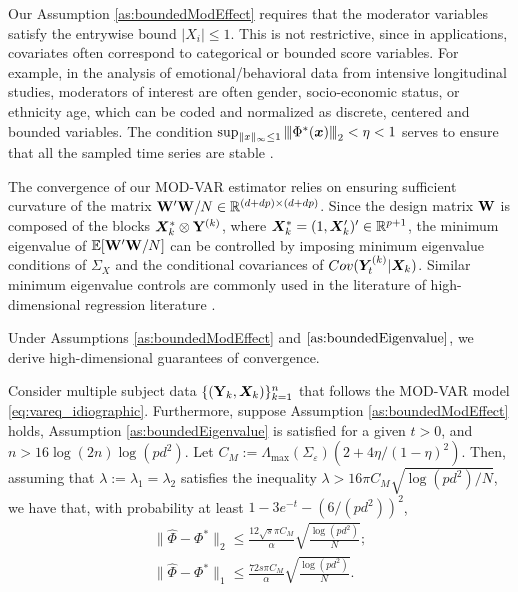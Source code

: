 Our Assumption \ref{as:boundedModEffect} requires that the moderator variables satisfy the entrywise bound $|X_i|\leq 1$. This is not restrictive, since in applications, covariates often correspond to categorical or bounded score variables. For example, in the analysis of emotional/behavioral data from intensive longitudinal studies, moderators of interest are often gender, socio-economic status, or ethnicity age, which can be coded and normalized as discrete, centered and bounded variables. The condition $\sup_{\|x\|_\infty \leq 1} {\left\vert\kern-0.25ex\left\vert\kern-0.25ex\left\vert \Phi^*(\bm{x}) \right\vert\kern-0.25ex\right\vert\kern-0.25ex\right\vert}_2 < \eta < 1 $ serves to ensure that all the sampled time series are stable \citep{basu2015regularized}.

The convergence of our MOD-VAR estimator relies on ensuring sufficient curvature of the matrix $\mathbf{W}'\mathbf{W}/N\in\mathbb{R}^{(d+dp)\times (d+dp)}$. Since the design matrix $\mathbf{W}$ is composed of the blocks  $\bm{X}_k^*\otimes \mathbf{Y}^{(k)}$, where $\bm{X}_k^* = (1,\bm{X}_k')'\in\mathbb{R}^{p+1}$, the minimum eigenvalue of $\mathbb{E}[\mathbf{W}'\mathbf{W}/N]$ can be controlled by imposing minimum eigenvalue conditions of $\Sigma_X$ and the conditional covariances of $Cov(\bm{Y}_t^{(k)}| \bm{X}_k)$. Similar minimum eigenvalue controls are commonly used in the literature of high-dimensional regression literature \citep{loh2011high,basu2015regularized,wainwright2019high}. 

Under Assumptions \ref{as:boundedModEffect} and $\ref{as:boundedEigenvalue}$, we derive high-dimensional guarantees of convergence.

\begin{thm}\label{thm:modvar_normconsistency}
    Consider multiple subject data $\{(\mathbf{Y}_k, \bm{X}_k)\}_{k=1}^n$ that follows the MOD-VAR model \eqref{eq:vareq_idiographic}. Furthermore, suppose Assumption \ref{as:boundedModEffect} holds, Assumption \ref{as:boundedEigenvalue} is satisfied for a given $t> 0$, and $n > 16\log(2n)\log(pd^2)$. Let $C_M := \Lambda_{\max}(\Sigma_\varepsilon)(2 + 4\eta / (1 - \eta)^2 ).$
    Then, assuming that $\lambda:= \lambda_1 = \lambda_2$ satisfies the inequality $\lambda > 16 \pi C_M  \sqrt{{\log(pd^2)}/{N}}$, we have that, with probability at least $1 - 3e^{-t} - (6/(pd^2))^2$,
    \begin{align}
        \|\hat\Phi - \Phi^* \|_2  \leq \frac{12\sqrt{s} \pi C_M}{\alpha}  \sqrt{\frac{\log(pd^2)}{N}};  \label{eq:consistency_l2}\\
        \| \hat\Phi - \Phi^*\|_1 \leq  \frac{72 s \pi C_M}{\alpha}  \sqrt{\frac{\log(pd^2)}{N}}.\label{eq:consistency_l1}
    \end{align}
\end{thm}

